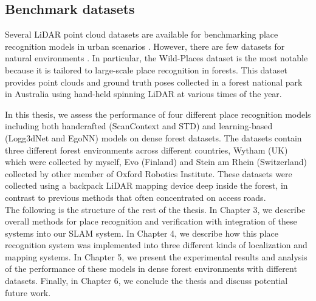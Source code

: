 \subsection*{Benchmark datasets} 
Several LiDAR point cloud datasets are available for benchmarking place recognition models in urban scenarios \cite{maddern2017ijrr, behley2019iccv, kim2020icra}. However, there are few datasets for natural environments \cite{triest2022icra, knights2023icra}. In particular, the Wild-Places dataset \cite{knights2023icra} is the most notable because it is tailored to large-scale place recognition in forests. This dataset provides point clouds and ground truth poses collected in a forest national park in Australia using hand-held spinning LiDAR at various times of the year. 

In this thesis, we assess the performance of four different place recognition models including both handcrafted (ScanContext and STD) and learning-based (Logg3dNet and EgoNN) models on dense forest datasets. The datasets contain three different forest environments across different countries, Wytham (UK) which were collected by myself, Evo (Finland) and Stein am Rhein (Switzerland) collected by other member of Oxford Robotics Institute. These datasets were collected using a backpack LiDAR mapping device deep inside the forest, in contrast to previous methods that often concentrated on access roads. \\

The following is the structure of the rest of the thesis. In Chapter 3, we describe overall methods for place recognition and verification with integration of these systems into our SLAM system. In Chapter 4, we describe how this place recognition system was implemented into three different kinds of localization and mapping systems. In Chapter 5, we present the experimental results and analysis of the performance of these models in dense forest environments with different datasets. Finally, in Chapter 6, we conclude the thesis and discuss potential future work.



